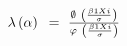 $\lambda \left( \alpha  \right){\rm{\ }} = {\rm{\ }}\frac{{\emptyset {\rm{\ }}\left( {\frac{{\beta 1Xi}}{\sigma }} \right)}}{{\varphi {\rm{\ }}\left( {\frac{{\beta 1Xi}}{\sigma }} \right)}}$
